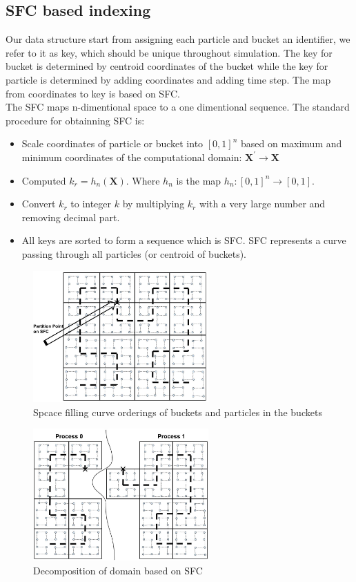 \documentclass[10pt,a4paper]{article}
\begin{document}
\subsection{SFC based indexing}
Our data structure start from assigning each particle and bucket an identifier, we refer to it as key, which should be unique throughout simulation. The key for bucket is determined by centroid coordinates of the bucket while the key for particle is determined by adding coordinates and adding time step. The map from coordinates to key is based on SFC.\\
The SFC \citep{sagan2012space} maps n-dimentional space to a one dimentional sequence. The standard procedure for obtainning SFC is: 
\begin{itemize}
\item Scale coordinates of particle or bucket into $[0,1]^n $ based on maximum and minimum coordinates of the computational domain: $\textbf{X}^\prime \rightarrow \textbf{X}$
\item Computed $k_r = h_n(\textbf{X})$. Where $h_n$ is the map $h_n: [0,1]^n \rightarrow [0,1]$. 
\item Convert $k_r$ to integer $k$ by multiplying $k_r$ with a very large number and removing decimal part.
\item All keys are sorted to form a sequence which is SFC. SFC represents a curve passing through all particles (or centroid of buckets).

\end{itemize}
{
\begin{figure}[h]
\caption{Spcace filling curve orderings of buckets and particles in the buckets}
\centering
\label{fig:SFC_particles_buckets}
\includegraphics[width=0.6\textwidth]{SFC_particles_buckets}
\end{figure}

\begin{figure}[h]
\caption{Decomposition of domain based on SFC}
\centering
\label{fig:SFC_particles_buckets_partition}
\includegraphics[width=0.6\textwidth]{SFC_particles_buckets_partition}
\end{figure}
}
\end{document}
